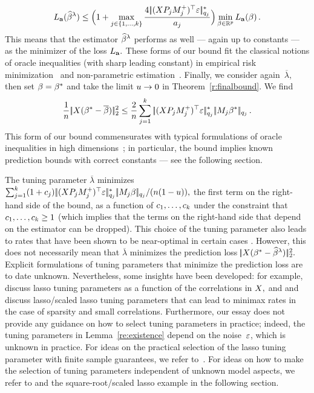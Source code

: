 \documentclass[bj]{imsart}
\newcommand{\normtwo}[1]{\ensuremath{\!|\!| #1 | \! |_{2}}}
\newcommand{\normqj}[1]{\ensuremath{\!|\!| #1 | \! |_{q_j}}}
\newcommand{\normqjd}[1]{\ensuremath{\!|\!| #1 | \! |_{q_j}^*}}
\newcommand{\1}{{\rm 1}\mskip -4,5mu{\rm l} }
\def\R{\mathbb{R}}
\newcommand{\betatrue}{\beta^*}
\newcommand{\lo}{\overline{\lambda}}
\newcommand{\genbeta}{\textcolor{black}{\beta}}
\newcommand{\genconstant}{\textcolor{black}{\ensuremath{u}}}
\newcommand{\riskconst}{\textcolor{black}{\ensuremath{a}}}
\newcommand{\Riskconst}{{\ensuremath{\bf \riskconst}}}
\newcommand{\Lossa}{\textcolor{black}{\ensuremath{L_\Riskconst}}}
\begin{document}
\begin{equation*}
  \Lossa(\estimatort)\leq\Big(1+\max_{j\in\{1,\dots,\numbergroups\}}\frac{4\,\normqjd{(\design\projectionmatrix_j\fusedmatrix_j^{+})^\top\noise}}{\riskconst_j}\Big) \min_{\genbeta\in\R^p}\Lossa(\genbeta)\,.
\end{equation*}
This means that the estimator $\widehat \beta^{\lambda}$ performs as well --- again up to constants --- as the minimizer of the loss $\Lossa.$ 
These forms of our bound fit the classical notions of oracle inequalities (with sharp leading constant) in empirical risk minimization~\cite[Chapter~1.1]{koltch11}  and non-parametric estimation~\cite[Chapter~1.8]{Tsybakov09}.
Finally, we consider again~$\lo,$ then set $\genbeta=\betatrue$ and take the limit $\genconstant\to0$ in Theorem~\ref{r:finalbound}. We find
\begin{equation}\label{special2}
  \frac{1}{n}\,\normtwo{\design(\betatrue-\estimatororacle)}^2\le\frac{2}{n}\sum_{j=1}^{\numbergroups}\,  \normqjd{(\design  \projectionmatrix_j\fusedmatrix_j^{+})^\top\noise}  \, \normqj{\fusedmatrix_j \betatrue}\,.
\end{equation}
This form of our bound commensurates with typical formulations of oracle inequalities in high dimensions~\cite[Chapters~2.4.2 and 6.2]{Buhlmann11}; in particular, the bound implies known prediction bounds with correct constants --- see the following section.

The tuning parameter $\lo$ minimizes  $\sum_{j=1}^{\numbergroups}(1+\tuningrelax_j)\,  \normqjd{(\design  \projectionmatrix_j\fusedmatrix_j^{+})^\top\noise}  \, \normqj{\fusedmatrix_j \genbeta}/(n(1-\genconstant)),$ the first term on the right-hand side of the bound, as a function of $\textcolor{black}{c}_1,\dots,\textcolor{black}{c}_{k}$ under the constraint that $\textcolor{black}{c}_1,\dots,\textcolor{black}{c}_{k}\geq 1$ (which implies that the  terms on the right-hand side that depend on the estimator can be dropped).  
This choice of the tuning parameter also leads to  rates that have been shown to be near-optimal in certain cases \cite[Proposition~4]{ArnakMoYo14}. 
However, this does not necessarily mean that $\lo$ minimizes the prediction loss $\normtwo{\design(\betatrue-\estimatort)}^2.$ 
Explicit formulations of tuning parameters that minimize the prediction loss are to date unknown. 
Nevertheless, some insights have been developed: for example, \cite{ArnakMoYo14,Hebiri13} discuss  lasso tuning parameters as a function of the correlations in $\textcolor{black}{X},$ and \cite{Bellec16} and \cite[Section~4]{Sun13} discuss lasso/scaled lasso tuning parameters that can lead to minimax rates in the case of sparsity and small correlations. 
Furthermore, our essay does not provide any guidance on how to select tuning parameters in practice; 
indeed, the tuning parameters in Lemma~\ref{re:existence}  depend on the noise~$\textcolor{black}{\varepsilon}$, which is unknown in practice. 
For ideas on the practical selection of the lasso tuning parameter with finite sample guarantees, we refer to~\cite{Chetelat_Lederer_Salmon14,Chichignoud_Lederer_Wainwright14}.
For ideas on how to make the selection of tuning parameters independent of unknown model aspects, we refer to \cite{Giraud12,Lederer14} and the square-root/scaled lasso example in the following section.
\end{document}
